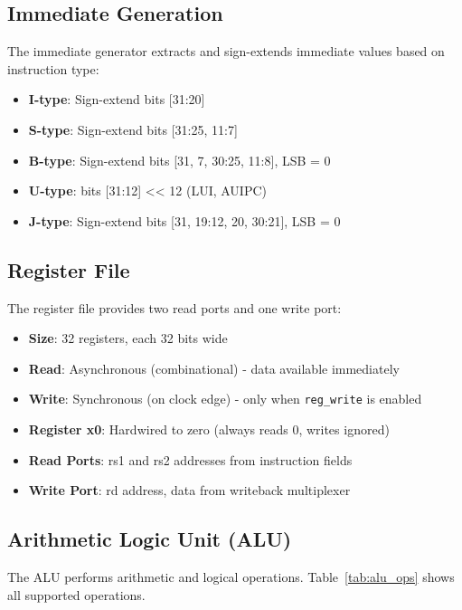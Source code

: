 \subsection{Immediate Generation}

The immediate generator extracts and sign-extends immediate values based on instruction type:

\begin{itemize}
    \item \textbf{I-type}: Sign-extend bits [31:20]
    \item \textbf{S-type}: Sign-extend bits [31:25, 11:7]
    \item \textbf{B-type}: Sign-extend bits [31, 7, 30:25, 11:8], LSB = 0
    \item \textbf{U-type}: bits [31:12] << 12 (LUI, AUIPC)
    \item \textbf{J-type}: Sign-extend bits [31, 19:12, 20, 30:21], LSB = 0
\end{itemize}

\subsection{Register File}

The register file provides two read ports and one write port:

\begin{itemize}
    \item \textbf{Size}: 32 registers, each 32 bits wide
    \item \textbf{Read}: Asynchronous (combinational) - data available immediately
    \item \textbf{Write}: Synchronous (on clock edge) - only when \texttt{reg\_write} is enabled
    \item \textbf{Register x0}: Hardwired to zero (always reads 0, writes ignored)
    \item \textbf{Read Ports}: rs1 and rs2 addresses from instruction fields
    \item \textbf{Write Port}: rd address, data from writeback multiplexer
\end{itemize}

\subsection{Arithmetic Logic Unit (ALU)}

The ALU performs arithmetic and logical operations. Table~\ref{tab:alu_ops} shows all supported operations.

